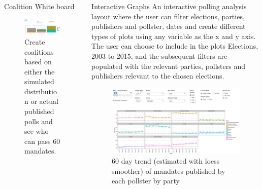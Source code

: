 \documentclass[final, hyperref={pdfpagelabels=false}]{beamer}
\begin{document}
\begin{frame}{}
\begin{columns}[t]
\begin{column}{.45\linewidth}
			\begin{block}{Coalition White board}
				\begin{figure}[h]
					\centering
					\includegraphics[width=.8\linewidth]{../www/coal_screen_grab}
					\caption{Create coalitions based on either the simulated distribution or actual published polls and see who can pass 60 mandates.}
					\label{fig:coal_screen_grab}
				\end{figure}				
			\end{block}
		\end{column}
		
		\begin{column}{.45\linewidth}
			\begin{block}{Interactive Graphs}
			An interactive polling analysis layout where the user can filter elections, parties, publishers and pollster, dates and create different types of plots using any variable as the x and y axis. The user can choose to include in the plots Elections, 2003 to 2015, and the subsequent filters are populated with the relevant parties, pollsters and publishers relevant to the chosen elections.
				\begin{figure}[h]
					\centering
					\includegraphics[width=.85\linewidth]{../www/pad_screen_grab}
					\caption{60 day trend (estimated with loess smoother) of mandates published by each pollster by party}
					\label{fig:pad_screen_grab}
				\end{figure}


\end{block}
\end{column}
\end{columns}
\end{frame}
\end{document}
